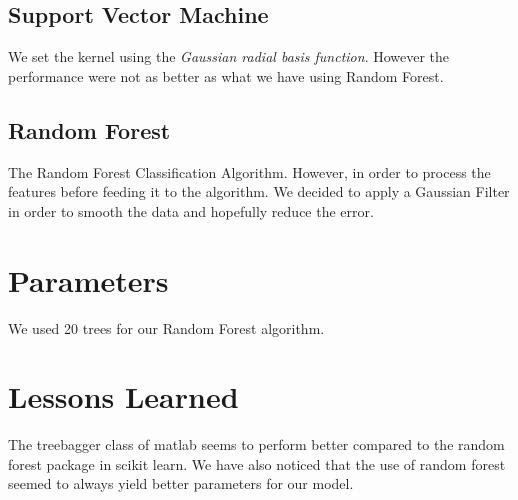 \documentclass[a4paper, 11pt]{article}
\begin{document}
\subsection{Support Vector Machine}
We set the kernel using the \emph{Gaussian radial basis function}.
However the performance were not as better as what we have using Random Forest.

\subsection{Random Forest}
The Random Forest Classification Algorithm.
However, in order to process the features before feeding it to the algorithm.
We decided to apply a Gaussian Filter in order to smooth the data and hopefully reduce the error.

\section{Parameters}
We used 20 trees for our Random Forest algorithm.

\section{Lessons Learned} The treebagger class of matlab seems to perform better  compared to the random forest package in scikit learn. We have also noticed that the use of random forest seemed to always yield better parameters for our model.
\end{document}
